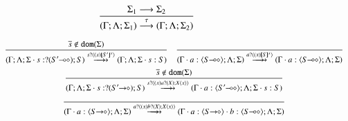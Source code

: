\begin{figure}
\[\begin{array}{c}
		\tree{
			\Sigma_1 \red \Sigma_2
		}{
			(\Gamma; \Lambda; \Sigma_1) \by{\tau} (\Gamma; \Lambda; \Sigma_2)
		}



	\end{array}
	\]

	\[
	\begin{array}{c}
%
%
%


		\tree{
			\dual{s} \notin \dom{\Sigma} %
		}{
			(\Gamma; \Lambda; \Sigma \cat s: \btinp{\lhot{S'}} S) \hby{\bactinp{s}{\abs{x}{\map{S'}^x}}} (\Gamma; \Lambda; \Sigma \cat s: S)
		}
		\quad
		\tree{
		}{
			(\Gamma \cat a: \chtype{\lhot{S}}; \Lambda; \Sigma) \hby{\bactinp{a}{\abs{x}{\map{S}^x}}} (\Gamma \cat a: \chtype{\lhot{S}}; \Lambda; \Sigma)
		}
		\\[6mm]


		\tree{
			\dual{s} \notin \dom{\Sigma} %
		}{
			(\Gamma; \Lambda; \Sigma \cat s: \btinp{\shot{S'}} S) \hby{\bactinp{s}{\abs{x}{\binp{a}{X} \appl{X}{x}}}} (\Gamma \cat a: \chtype{\lhot{S'}}; \Lambda; \Sigma \cat s: S)
		}
		\\[6mm]
		\tree{
		}{
			(\Gamma \cat a: \chtype{\shot{S}}; \Lambda; \Sigma) \hby{\bactinp{a}{\abs{x}{\binp{b}{X} \appl{X}{x}}}} (\Gamma \cat a: \chtype{\shot{S}} \cat b: \chtype{\lhot{S}}; \Lambda; \Sigma)
		}
		\\[6mm]




\end{array}\]
\end{figure}
